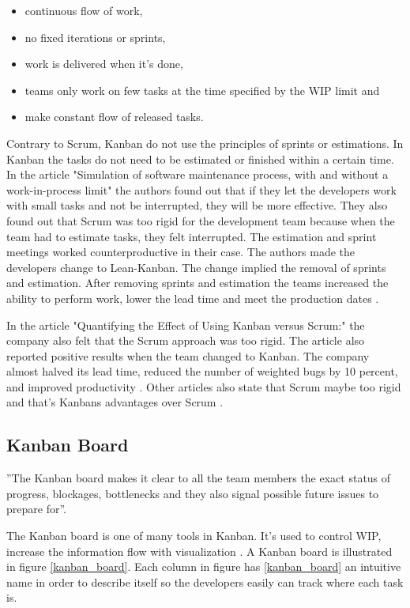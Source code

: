 \documentclass[UKenglish]{ifimaster}  %
\begin{document}
\begin{itemize}
\item continuous flow of work,
\item	no fixed iterations or sprints,
\item work is delivered when it's done,
\item teams only work on few tasks at the time specified by the WIP limit and
\item make constant flow of released tasks.
\end{itemize}


Contrary to Scrum, Kanban do not use the principles of sprints or estimations. In Kanban the tasks do not need to be estimated or finished within a certain time. In the article "Simulation of software maintenance process, with and without a work-in-process limit" \parencite{SMR:SMR1599} the authors found out that if they let the developers work with small tasks and not be interrupted, they will be more effective. They also found out that Scrum was too rigid for the development team because when the team had to estimate tasks, they felt interrupted.  The estimation and sprint meetings worked counterproductive in their case. The authors made the developers change to Lean-Kanban.  The change implied the removal of sprints and estimation. After removing sprints and estimation the teams increased the ability to perform work, lower the lead time and meet the production dates \parencite{SMR:SMR1599}.

In the article "Quantifying the Effect of Using Kanban versus Scrum:" the company also felt that the Scrum approach was too rigid. The article also reported positive results when the team changed to Kanban.  The company almost halved its lead time, reduced the number of weighted bugs by 10 percent, and improved productivity \parencite{Dag}. Other articles also state that Scrum maybe too rigid and that's Kanbans advantages over Scrum \parencite{beedle1999scrum} \parencite{brekkanintroducing} .  

\subsection {Kanban Board}
''The Kanban board makes it clear to all the team members the exact status of progress, blockages, bottlenecks and they also signal possible future issues to prepare for''\parencite{Joyce}.

The Kanban board is one of many tools in Kanban. It's used to control WIP, increase the information flow with visualization \parencite{SMR:SMR1599}. A Kanban board is illustrated in figure \ref{kanban_board}. Each column in figure has \ref{kanban_board} an intuitive name in order to describe itself so the developers easily can track where each task is. 
\end{document}
